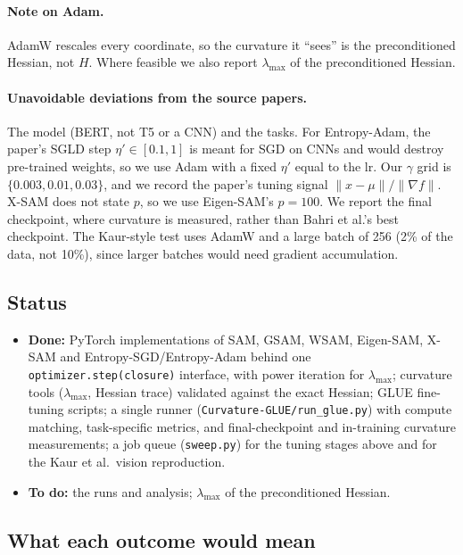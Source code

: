 \documentclass[11pt]{article}
\newcommand{\lmax}{\lambda_{\max}}
\theoremstyle{plain}
\begin{document}
\paragraph{Note on Adam.} AdamW rescales every coordinate, so the curvature it ``sees'' is the preconditioned Hessian, not $H$.
Where feasible we also report $\lmax$ of the preconditioned Hessian.

\paragraph{Unavoidable deviations from the source papers.} The model (BERT, not T5 or a CNN) and the tasks.
For Entropy-Adam, the paper's SGLD step $\eta'\in[0.1,1]$ is meant for SGD on CNNs and would destroy pre-trained weights, so we use Adam with a fixed $\eta'$ equal to the lr. Our $\gamma$ grid is $\{0.003,0.01,0.03\}$, and we record the paper's tuning signal $\|x-\mu\|/\|\nabla f\|$.
X-SAM does not state $p$, so we use Eigen-SAM's $p=100$.
We report the final checkpoint, where curvature is measured, rather than Bahri et al.'s best checkpoint.
The Kaur-style test uses AdamW and a large batch of 256 (2\% of the data, not 10\%), since larger batches would need gradient accumulation.

\subsection{Status}

\begin{itemize}
  \item \textbf{Done:} PyTorch implementations of SAM, GSAM, WSAM, Eigen-SAM, X-SAM and Entropy-SGD/Entropy-Adam behind one \texttt{optimizer.step(closure)} interface,
        with power iteration for $\lmax$; curvature tools ($\lmax$, Hessian trace) validated against the exact Hessian; GLUE fine-tuning scripts;
        a single runner (\texttt{Curvature-GLUE/run\_glue.py}) with compute matching, task-specific metrics, and final-checkpoint and in-training curvature measurements;
        a job queue (\texttt{sweep.py}) for the tuning stages above and for the Kaur et al.\ vision reproduction.
  \item \textbf{To do:} the runs and analysis; $\lmax$ of the preconditioned Hessian.
\end{itemize}

\subsection{What each outcome would mean}
\end{document}
